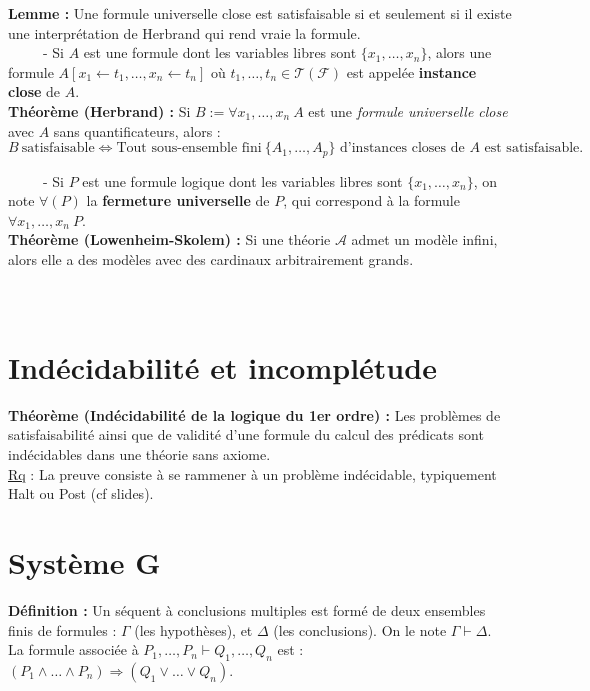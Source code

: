 \documentclass[11pt,a4paper]{article}
\begin{document}
\textbf{Lemme :} Une formule universelle close est satisfaisable si et seulement si il existe une interprétation de Herbrand qui rend vraie la formule. \\

\ \ \ \ \ - Si $A$ est une formule dont les variables libres sont $\{x_1,\dots,x_n\}$, alors une formule $A[x_1 \leftarrow t_1, \dots, x_n \leftarrow t_n]$ où $t_1,\dots,t_n \in \mathcal{T}(\mathcal{F})$ est appelée \textbf{instance close} de $A$. \\

\textbf{Théorème (Herbrand) :} Si $B:=\forall x_1,\dots,x_n \ A$ est une \textit{formule universelle close} avec $A$ sans quantificateurs, alors :
\[B \ \text{satisfaisable} \Leftrightarrow \text{Tout sous-ensemble fini} \  \{A_1,\dots,A_p\} \text{ d'instances closes de } A \text{ est satisfaisable.} \]

\ \ \ \ \ - Si $P$ est une formule logique dont les variables libres sont $\{x_1,\dots,x_n\}$, on note $\forall(P)$ la \textbf{fermeture universelle} de $P$, qui correspond à la formule $\forall x_1, \dots , x_n \ P$. \\

\textbf{Théorème (Lowenheim-Skolem) :} Si une théorie $\mathcal{A}$ admet un modèle infini, alors elle a des modèles avec des cardinaux arbitrairement grands. \\ \\ \\

\section{Indécidabilité et incomplétude}

\textbf{Théorème (Indécidabilité de la logique du 1er ordre) :} Les problèmes de satisfaisabilité ainsi que de validité d’une formule du calcul des prédicats sont indécidables dans une théorie sans axiome. \\

\underline{Rq} : La preuve consiste à se rammener à un problème indécidable, typiquement Halt ou Post (cf slides). \\


\section{Système G}

\textbf{Définition :} Un séquent à conclusions multiples est formé de deux ensembles finis de formules : $\Gamma$ (les hypothèses), et $\Delta$ (les conclusions). On le note $\Gamma	\vdash \Delta$. \\
La formule associée à $P_1,\dots ,P_n \vdash Q_1,\dots, Q_n$ est : $(P_1\land \dots \land P_n) \Rightarrow (Q_1 \lor \dots \lor Q_n)$. \\
\end{document}
